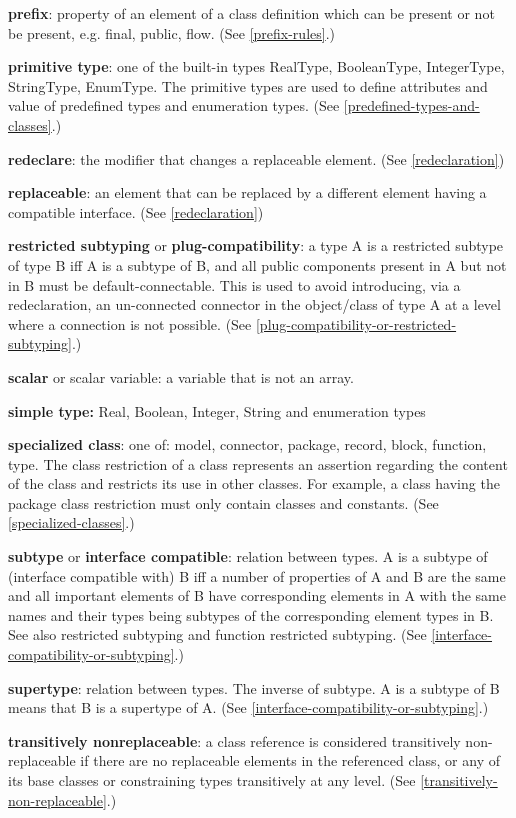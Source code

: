 \documentclass[10pt,a4paper]{report}
\begin{document}
\textbf{prefix}: property of an element of a class definition which can
be present or not be present, e.g. final, public, flow. (See \ref{prefix-rules}.)

\textbf{primitive type}: one of the built-in types RealType,
BooleanType, IntegerType, StringType, EnumType. The primitive types are
used to define attributes and value of predefined types and enumeration
types. (See \ref{predefined-types-and-classes}.)

\textbf{redeclare}: the modifier that changes a replaceable element.
(See \ref{redeclaration})

\textbf{replaceable}: an element that can be replaced by a different
element having a compatible interface. (See \ref{redeclaration})

\textbf{restricted subtyping} or \textbf{plug-compatibility}: a type A
is a restricted subtype of type B iff A is a subtype of B, and all
public components present in A but not in B must be default-connectable.
This is used to avoid introducing, via a redeclaration, an un-connected
connector in the object/class of type A at a level where a connection is
not possible. (See \ref{plug-compatibility-or-restricted-subtyping}.)

\textbf{scalar} or scalar variable: a variable that is not an array.

\textbf{simple type:} Real, Boolean, Integer, String and enumeration
types

\textbf{specialized class}: one of: model, connector, package, record,
block, function, type. The class restriction of a class represents an
assertion regarding the content of the class and restricts its use in
other classes. For example, a class having the package class restriction
must only contain classes and constants. (See \ref{specialized-classes}.)

\textbf{subtype} or \textbf{interface compatible}: relation between
types. A is a subtype of (interface compatible with) B iff a number of
properties of A and B are the same and all important elements of B have
corresponding elements in A with the same names and their types being
subtypes of the corresponding element types in B. See also restricted
subtyping and function restricted subtyping. (See \ref{interface-compatibility-or-subtyping}.)

\textbf{supertype}: relation between types. The inverse of subtype. A is
a subtype of B means that B is a supertype of A. (See \ref{interface-compatibility-or-subtyping}.)

\textbf{transitively nonreplaceable}: a class reference is considered
transitively non-replaceable if there are no replaceable elements in the
referenced class, or any of its base classes or constraining types
transitively at any level. (See \ref{transitively-non-replaceable}.)
\end{document}
